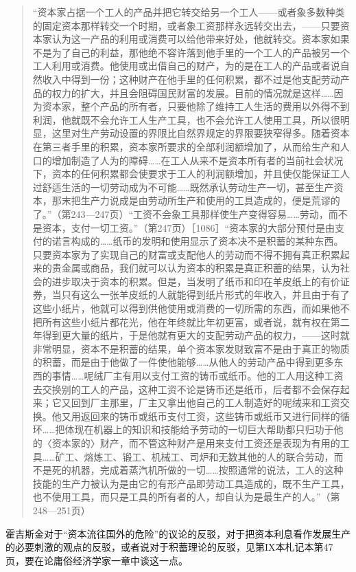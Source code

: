 \begin{quote}{“资本家占据一个工人的产品并把它转交给另一个工人——或者象多数种类的固定资本那样转交一个时期，或者象工资那样永远转交出去，——只要资本家认为这一产品的利用或消费可以给他带来好处，他就转交。资本家如果不是为了自己的利益，那他绝不容许落到他手里的一个工人的产品被另一个工人利用或消费。他使用或出借自己的财产，为的是在工人的产品或者说自然收入中得到一份；这种财产在他手里的任何积累，都不过是他支配劳动产品的权力的扩大，并且会阻碍国民财富的发展。目前的情况就是这样……因为资本家，整个产品的所有者，只要他除了维持工人生活的费用以外得不到利润，他就既不会允许工人生产工具，也不会允许工人使用工具，所以很明显，这里对生产劳动设置的界限比自然界规定的界限要狭窄得多。随着资本在第三者手里的积累，资本家所要求的全部利润额增加了，从而给生产和人口的增加制造了人为的障碍……在工人从来不是资本所有者的当前社会状况下，资本的任何积累都会使要求于工人的利润额增加，并且使仅能保证工人过舒适生活的一切劳动成为不可能……既然承认劳动生产一切，甚至生产资本，那末把生产力说成是由劳动所生产和使用的工具造成的，便是荒谬的了。”（第243—247页）“工资不会象工具那样使生产变得容易……劳动，而不是资本，支付一切工资。”（第247页）［1086］“资本家的大部分预付是由支付的诺言构成的……纸币的发明和使用显示了资本决不是积蓄的某种东西。只要资本家为了实现自己的财富或支配他人的劳动而不得不拥有真正积累起来的贵金属或商品，我们就可以认为资本的积累是真正积蓄的结果，认为社会的进步取决于资本的积累。但是，当发明了纸币和印在羊皮纸上的有价证券，当只有这么一张羊皮纸的人就能得到纸片形式的年收入，并且由于有了这些小纸片，他就可以得到供他使用或消费的一切所需的东西，而如果他不把所有这些小纸片都花光，他在年终就比年初更富，或者说，就有权在第二年得到更大量的纸片，于是他就有更大的支配劳动产品的权力，——这时就非常明显，资本不是积蓄的结果，单个资本家发财致富不是由于真正的物质的积蓄，而是由于他做了一件使他能够……从他人的劳动产品中得到更多东西的事情……呢绒厂主有用以支付工资的铸币或纸币。他的工人用这种工资去交换别的工人的产品，这种工资不论是铸币还是纸币，后者都不会保存起来；它又回到厂主那里，厂主又拿出他自己的工人制造好的呢绒来和工资交换。他又用返回来的铸币或纸币支付工资，这些铸币或纸币又进行同样的循环……把体现在机器上的知识和技能给予劳动的一切巨大帮助都只归功于他的〈资本家的〉财产，而不管这种财产是用来支付工资还是表现为有用的工具……矿工、熔炼工、锻工、机械工、司炉和无数其他的人的联合劳动，而不是死的机器，完成着蒸汽机所做的一切……按照通常的说法，工人的这种技能的生产力被认为是由它的有形产品即劳动工具造成的，既不生产工具，也不使用工具，而只是工具的所有者的人，却自认为是最生产的人。”（第248—251页）}\end{quote}

霍吉斯金对于“资本流往国外的危险”的议论的反驳，对于把资本利息看作发展生产的必要刺激的观点的反驳，或者说对于积蓄理论的反驳，见第IX本札记本第47页，要在论庸俗经济学家一章中谈这一点。


